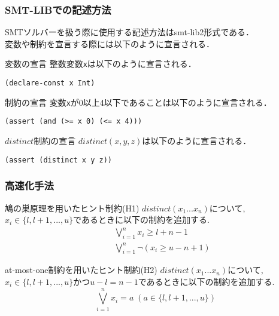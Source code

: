\documentclass [dvipdfmx,11pt]{beamer}
\newcommand{\distinct}{$distinct$}
\begin{document}
\begin{frame}[fragile]\small
    \frametitle{SMT-LIBでの記述方法}
    SMTソルバーを扱う際に使用する記述方法はsmt-lib2形式である．\\
    変数や制約を宣言する際には以下のように宣言される．
    \begin{exampleblock}{変数の宣言}
        整数変数\verb|x|は以下のように宣言される．
\begin{verbatim}
(declare-const x Int)
\end{verbatim}
    \end{exampleblock}
    \begin{exampleblock}{制約の宣言}
        変数\verb|x|が0以上4以下であることは以下のように宣言される．
\begin{verbatim}
(assert (and (>= x 0) (<= x 4)))
\end{verbatim}
    \end{exampleblock}
    \begin{exampleblock}{\distinct 制約の宣言}
        $distinct(x,y,z)$は以下のように宣言される．
\begin{verbatim}
(assert (distinct x y z))
\end{verbatim}
    \end{exampleblock}
\end{frame}


\begin{frame}
    \frametitle{高速化手法}
    \vspace{-3mm}
    \begin{exampleblock}{鳩の巣原理を用いたヒント制約(H1)}
        $distinct(x_1 ... x_n)$について, $x_i \in \{l, l+1, ..., u\}$であるときに以下の制約を追加する.
        \vspace{-3mm}
        \begin{eqnarray}
            && \bigvee_{i=1}^n   x_i \geq l+n-1\\
            && \bigvee_{i=1}^n \lnot(x_i \geq u-n+1)
        \end{eqnarray}
    \end{exampleblock}
    \begin{exampleblock}{at-most-one制約を用いたヒント制約(H2)}
        $distinct(x_1 ... x_n)$について, $x_i \in \{l, l+1, ..., u\}$かつ$u-l=n-1$であるときに以下の制約を追加する.\\
        \vspace{-3mm}
        $$\bigvee_{i=1}^n x_i=a \; (a \in \{l, l+1, ..., u\})$$
    \end{exampleblock}
\end{frame}
\end{document}
